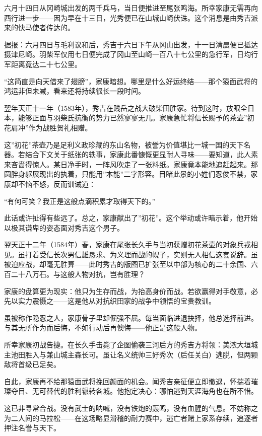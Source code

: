 \documentclass[
]{article}
\begin{document}
六月十四日从冈崎城出发的两千兵马，当日便推进至尾张鸣海。所幸家康无需再向西行进一步------因为早在十三日，光秀便已在山城山崎伏诛。这个消息是由秀吉派来的快马使者传达的。

据报：六月四日与毛利议和后，秀吉于六日下午从冈山出发，十一日清晨便已抵达摄津尼崎。羽柴军仅用七日便完成了冈山至山崎一百八十七公里的急行军，日均行军距离竟达二十七公里。

``这简直是向天借来了翅膀''，家康暗想。哪里是什么好运终结------那个猿面武将的鸿运非但未减，看来还将持续很长一段时间。

翌年天正十一年（1583年），秀吉在贱岳之战大破柴田胜家。待到这时，放眼全日本，能够正面与羽柴氏抗衡的势力已然寥寥无几。家康急忙将信长赐予的茶壶''初花肩冲''作为战胜贺礼相赠。

这''初花''茶壶乃是足利义政珍藏的东山名物，被誉为价值堪比一城一国的天下名器。若结合下文关于纸张的轶事，家康此番慷慨更显耐人寻味------要知道，此人素来吝啬得惊人。某日净手时，一阵风吹走了一张料纸。家康竟本能地追赶起来。那圆胖身躯展现出的执着，只能用''本能''二字形容。目睹此景的小姓们忍俊不禁，家康却不恼不怒，反而训诫道：

``有何可笑？我正是这般点滴积累才取得天下的。''

此话或许扯得有些远了。总之，家康献出了''初花''。这个举动或许暗示着，他开始以极其谦卑的姿态面对秀吉这个男子。

翌天正十二年（1584年）春，家康在尾张长久手与当初获赠初花茶壶的对象兵戎相见。虽打着受信长次男信雄恳求、为义理而战的幌子，实则无人相信这套说辞。虽被迫应战，却毫无胜算------此时秀吉的版图已扩张至以中部为核心的二十余国、六百二十八万石。与这般人物对抗，岂有胜理？

家康的盘算更为现实：他只为生存而战，为抬高身价而战。若欲赢得对手敬意，必先以实力震慑之------这是他从对抗织田家的战争中领悟的宝贵教训。

虽被称作隐忍之人，家康骨子里却倔强不屈。每当面临进退抉择，他总选择前进。与其无所作为而后悔，不如行动后再懊悔------他正是这般人物。

所幸家康初战告捷。在长久手击毙了企图偷袭三河后方的秀吉方将领：美浓大垣城主池田胜入与兼山城主森长可。虽让名义统帅三好秀次（后任关白）逃脱，但两颗敌将首级已足矣。

自此，家康再不给那猿面武将挽回颜面的机会。闻秀吉亲征便立即撤退，怀揣着璀璨夺目、无可替代的胜利辗转各城。他抱定决心：哪怕逃到天涯海角也在所不惜。

这已非寻常合战。没有武士的呐喊，没有铁炮的轰鸣，没有血腥的气息。不妨称之为二人间的马拉松------在这场略显滑稽的耐力赛中，逃亡者赌上家系存续，追逐者押注名誉与天下。
\end{document}
